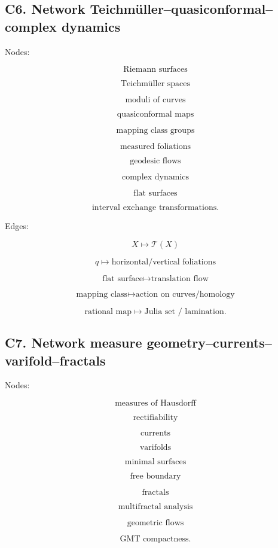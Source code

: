 \documentclass[11pt]{article}
\begin{document}
\subsection{C6. Network Teichmüller--quasiconformal--complex dynamics}

Nodes:

\[
\text{Riemann surfaces}
\]

\[
\text{Teichmüller spaces}
\]

\[
\text{moduli of curves}
\]

\[
\text{quasiconformal maps}
\]

\[
\text{mapping class groups}
\]

\[
\text{measured foliations}
\]

\[
\text{geodesic flows}
\]

\[
\text{complex dynamics}
\]

\[
\text{flat surfaces}
\]

\[
\text{interval exchange transformations}.
\]

Edges:

\[
X\mapsto \mathcal T(X)
\]

\[
q\mapsto \text{horizontal/vertical foliations}
\]

\[
\text{flat surface}\mapsto \text{translation flow}
\]

\[
\text{mapping class}\mapsto \text{action on curves/homology}
\]

\[
\text{rational map}\mapsto \text{Julia set / lamination}.
\]



\subsection{C7. Network measure geometry--currents--varifold--fractals}

Nodes:

\[
\text{measures of Hausdorff}
\]

\[
\text{rectifiability}
\]

\[
\text{currents}
\]

\[
\text{varifolds}
\]

\[
\text{minimal surfaces}
\]

\[
\text{free boundary}
\]

\[
\text{fractals}
\]

\[
\text{multifractal analysis}
\]

\[
\text{geometric flows}
\]

\[
\text{GMT compactness}.
\]
\end{document}
